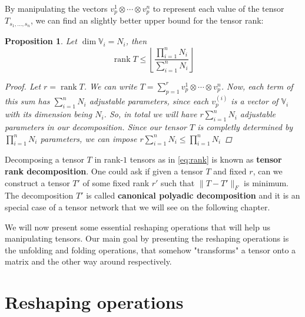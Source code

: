 \documentclass[11pt,a4paper,openright,oneside]{book}
\numberwithin{equation}{section}
\newtheorem{prop0}[defn0]{Proposition}
\newenvironment{proposition}{\bigskip \begin{prop0}}{\end{prop0}}
\newcommand{\refeq}[1]{\cref{#1}}
\DeclareMathOperator{\rank}{rank}
\begin{document}
By manipulating the vectors $v_p^1 \otimes \cdots \otimes v_p^n$ to represent each value of the tensor
$T_{s_1, \dots, s_n}$, we can find an slightly better upper bound for the tensor rank:
\begin{proposition} Let $\dim \mathbb{V}_i = N_i$, then
    \begin{equation} \label{eq:rank-dimensional-bound}
        \rank{T} \leqslant \left\lfloor \frac{\prod_{i=1}^n N_i}{\sum_{i=1}^n N_i} \right\rfloor
    \end{equation}

\begin{proof}
    Let $r = \rank{T}$. We can write $T = \sum_{p=1}^r v_p^{1} \otimes \cdots \otimes v_p^{n}$. Now, each term of this
    sum has $\sum_{i=1}^n N_i$ adjustable parameters, since each $v_p^{(i)}$ is a vector of $\mathbb{V}_i$ with its dimension being $N_i$.
    So, in total we will have $r \sum_{i=1}^n N_i$ adjustable parameters in our decomposition. Since our tensor $T$ is completly
    determined by $\prod_{i=1}^n N_i$ parameters, we can impose $r \sum_{i=1}^n N_i \leqslant \prod_{i=1}^n N_i$ 
\end{proof}
\end{proposition}

Decomposing a tensor $T$ in rank-$1$ tensors as in \refeq{eq:rank} is known as \textbf{tensor rank decomposition}.
One could ask if given a tensor $T$ and fixed $r$, can we construct a tensor $T'$ of some fixed rank $r'$ such that
$\| T - T' \|_F$ is minimum. The decomposition $T'$ is called \textbf{canonical polyadic decomposition} and it is
an special case of a tensor network that we will see on the following chapter.

We will now present some essential reshaping operations that will help us manipulating tensors. Our main goal
by presenting the reshaping operations is the unfolding and folding operations, that somehow "transforms" a tensor onto a matrix
and the other way around respectively.



\section{Reshaping operations}
\end{document}
